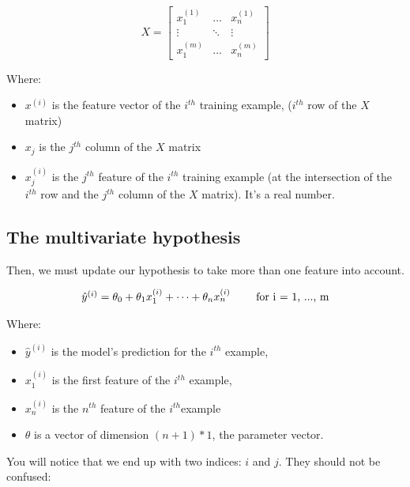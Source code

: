 \documentclass[]{article}
\begin{document}
\large

\[
X = \begin{bmatrix} 
x_{1}^{(1)} & \dots & x_{n}^{(1)}\\
\vdots & \ddots & \vdots\\
x_{1}^{(m)} & \dots & x_{n}^{(m)}\end{bmatrix}
\] \normalsize

Where:

\begin{itemize}
\item
  \(x^{(i)}\) is the feature vector of the \(i^{th}\) training example,
  (\(i^{th}\) row of the \(X\) matrix)
\item
  \(x_{j}\) is the \(j^{th}\) column of the \(X\) matrix
\item
  \(x_{j}^{(i)}\) is the \(j^{th}\) feature of the \(i^{th}\) training
  example (at the intersection of the \(i^{th}\) row and the \(j^{th}\)
  column of the \(X\) matrix). It's a real number.
\end{itemize}

\hypertarget{the-multivariate-hypothesis}{%
\subsection{The multivariate
hypothesis}\label{the-multivariate-hypothesis}}

Then, we must update our hypothesis to take more than one feature into
account.

\large

\[
\begin{matrix}\large
\hat{y}^{(i)} = \theta_0 + \theta_1 x_{1}^{(i)} + \dots + \theta_n x_{n}^{(i)} & & \text{ for i = 1, ..., m}    
\end{matrix}\normalsize
\] \normalsize

Where:

\begin{itemize}
\item
  \(\hat{y}^{(i)}\) is the model's prediction for the \(i^{th}\)
  example,
\item
  \(x_{1}^{(i)}\) is the first feature of the \(i^{th}\) example,
\item
  \(x_{n}^{(i)}\) is the \(n^{th}\) feature of the \(i^{th}\)example
\item
  \(\theta\) is a vector of dimension \((n + 1) * 1\), the parameter
  vector.
\end{itemize}

You will notice that we end up with two indices: \(i\) and \(j\). They
should not be confused:
\end{document}
